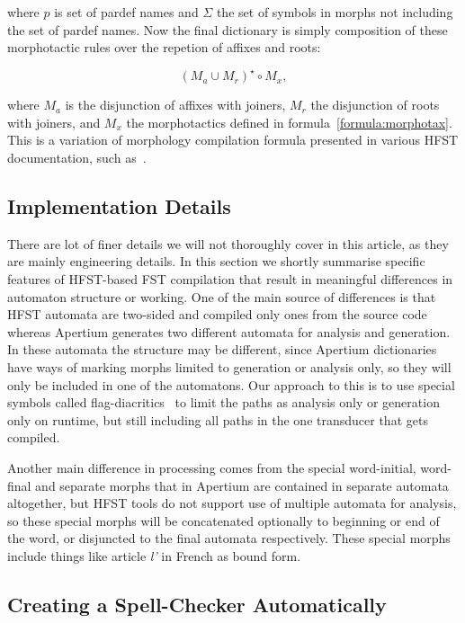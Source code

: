 \documentclass[a4paper]{article}
\begin{document}
where $p$ is set of pardef names and $\Sigma$ the set
of symbols in morphs not including the set of pardef names.  Now the final
dictionary is simply composition of these morphotactic rules over the repetion
of affixes and roots:

\begin{equation}\label{formula:lexical}
(M_a \cup M_r)^{\star} \circ M_x,
\end{equation}

where $M_{a}$ is the disjunction of affixes with joiners, $M_{r}$ the
disjunction of roots with joiners, and $M_x$ the morphotactics defined in
formula~\ref{formula:morphotax}. This is a variation of morphology compilation
formula presented in various HFST documentation, such as~\cite{hfst/2011}.

\subsection{Implementation Details}

There are lot of finer details we will not thoroughly cover in this article, as
they are mainly engineering details. In this section we shortly summarise
specific features of HFST-based FST compilation that result in meaningful
differences in automaton structure or working. One of the main source of
differences is that HFST automata are two-sided and compiled only ones from the
source code whereas Apertium generates two different automata for analysis and
generation. In these automata the structure may be different, since Apertium
dictionaries have ways of marking morphs limited to generation or analysis
only, so they will only be included in one of the automatons. Our approach to
this is to use special symbols called flag-diacritics~\cite{beesley/2003} to
limit the paths as analysis only or generation only on runtime, but still
including all paths in the one transducer that gets compiled.

Another main difference in processing comes from the special word-initial, 
word-final and separate morphs that in Apertium are contained in separate
automata altogether, but HFST tools do not support use of multiple automata
for analysis, so these special morphs will be concatenated optionally to
beginning or end of the word, or disjuncted to the final automata respectively.
These special morphs include things like article \emph{l'} in French as bound
form.

\subsection{Creating a Spell-Checker Automatically}
\end{document}
